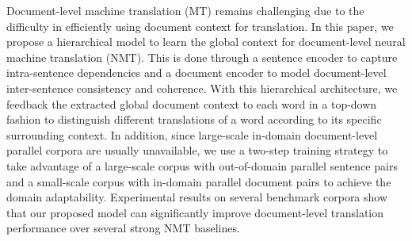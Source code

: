 Document-level machine translation (MT) remains challenging due to the difficulty in efficiently using document context for translation. In this paper, we propose a hierarchical model to learn the global context for document-level neural machine translation (NMT). This is done through a sentence encoder to capture intra-sentence dependencies and a document encoder to model document-level inter-sentence consistency and coherence. With this hierarchical  architecture, we feedback the extracted global document context to each word in a top-down fashion to distinguish different translations of a word according to its specific surrounding context. In addition, since large-scale in-domain document-level parallel corpora are usually unavailable, we use a two-step training strategy to take advantage of a large-scale corpus with out-of-domain parallel sentence pairs and a small-scale corpus with in-domain parallel document pairs to achieve the domain adaptability. Experimental results on several benchmark corpora show that our proposed model can significantly improve document-level translation performance over several strong NMT baselines.
